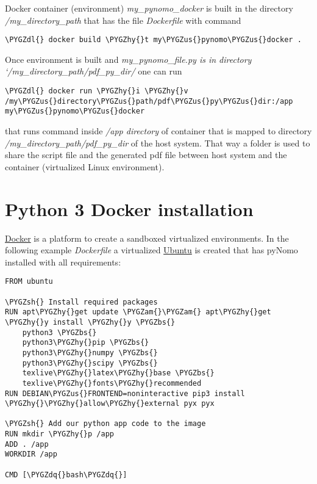 \documentclass[a4paper,11pt,english]{sphinxmanual}
\def\PYGZbs{\char`\\}
\def\PYGZus{\char`\_}
\def\PYGZam{\char`\&}
\def\PYGZsh{\char`\#}
\def\PYGZdl{\char`\$}
\def\PYGZhy{\char`\-}
\def\PYGZdq{\char`\"}
\begin{document}
Docker container (environment) \emph{my\_pynomo\_docker} is built in the directory \emph{/my\_directory\_path} that has the file \emph{Dockerfile} with command

\begin{Verbatim}[commandchars=\\\{\},formatcom=\scriptsize]
\PYGZdl{} docker build \PYGZhy{}t my\PYGZus{}pynomo\PYGZus{}docker .
\end{Verbatim}

Once environment is built and \emph{my\_pynomo\_file.py is in directory {}`/my\_directory\_path/pdf\_py\_dir/} one can run

\begin{Verbatim}[commandchars=\\\{\},formatcom=\scriptsize]
\PYGZdl{} docker run \PYGZhy{}i \PYGZhy{}v /my\PYGZus{}directory\PYGZus{}path/pdf\PYGZus{}py\PYGZus{}dir:/app my\PYGZus{}pynomo\PYGZus{}docker
\end{Verbatim}

that runs command  inside \emph{/app directory} of container that is mapped to directory \emph{/my\_directory\_path/pdf\_py\_dir} of the host system.
That way a folder is used to share the script file and the generated pdf file between host system and the container (virtualized
Linux environment).


\section{Python 3 Docker installation}
\label{installation/installation:python-3-docker-installation}
\href{https://www.docker.com/}{Docker} is a platform to create a sandboxed virtualized environments. In the following example \emph{Dockerfile} a virtualized
\href{http://ubuntu.com/}{Ubuntu} is created that has pyNomo installed with all requirements:

\begin{Verbatim}[commandchars=\\\{\},formatcom=\scriptsize]
FROM ubuntu

\PYGZsh{} Install required packages
RUN apt\PYGZhy{}get update \PYGZam{}\PYGZam{} apt\PYGZhy{}get \PYGZhy{}y install \PYGZhy{}y \PYGZbs{}
    python3 \PYGZbs{}
    python3\PYGZhy{}pip \PYGZbs{}
    python3\PYGZhy{}numpy \PYGZbs{}
    python3\PYGZhy{}scipy \PYGZbs{}
    texlive\PYGZhy{}latex\PYGZhy{}base \PYGZbs{}
    texlive\PYGZhy{}fonts\PYGZhy{}recommended
RUN DEBIAN\PYGZus{}FRONTEND=noninteractive pip3 install \PYGZhy{}\PYGZhy{}allow\PYGZhy{}external pyx pyx

\PYGZsh{} Add our python app code to the image
RUN mkdir \PYGZhy{}p /app
ADD . /app
WORKDIR /app

CMD [\PYGZdq{}bash\PYGZdq{}]
\end{Verbatim}
\end{document}
